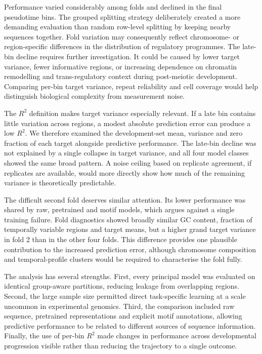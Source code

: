 \documentclass[a4paper,12pt]{article}
\begin{document}
Performance varied considerably among folds and declined in the final pseudotime bins. The grouped splitting strategy deliberately created a more demanding evaluation than random row-level splitting by keeping nearby sequences together. Fold variation may consequently reflect chromosome- or region-specific differences in the distribution of regulatory programmes. The late-bin decline requires further investigation. It could be caused by lower target variance, fewer informative regions, or increasing dependence on chromatin remodelling and trans-regulatory context during post-meiotic development. Comparing per-bin target variance, repeat reliability and cell coverage would help distinguish biological complexity from measurement noise.

The $R^2$ definition makes target variance especially relevant. If a late bin contains little variation across regions, a modest absolute prediction error can produce a low $R^2$. We therefore examined the development-set mean, variance and zero fraction of each target alongside predictive performance. The late-bin decline was not explained by a single collapse in target variance, and all four model classes showed the same broad pattern. A noise ceiling based on replicate agreement, if replicates are available, would more directly show how much of the remaining variance is theoretically predictable.

The difficult second fold deserves similar attention. Its lower performance was shared by raw, pretrained and motif models, which argues against a single training failure. Fold diagnostics showed broadly similar GC content, fraction of temporally variable regions and target means, but a higher grand target variance in fold 2 than in the other four folds. This difference provides one plausible contribution to the increased prediction error, although chromosome composition and temporal-profile clusters would be required to characterise the fold fully.

The analysis has several strengths. First, every principal model was evaluated on identical group-aware partitions, reducing leakage from overlapping regions. Second, the large sample size permitted direct task-specific learning at a scale uncommon in experimental genomics. Third, the comparison included raw sequence, pretrained representations and explicit motif annotations, allowing predictive performance to be related to different sources of sequence information. Finally, the use of per-bin $R^2$ made changes in performance across developmental progression visible rather than reducing the trajectory to a single outcome.
\end{document}
